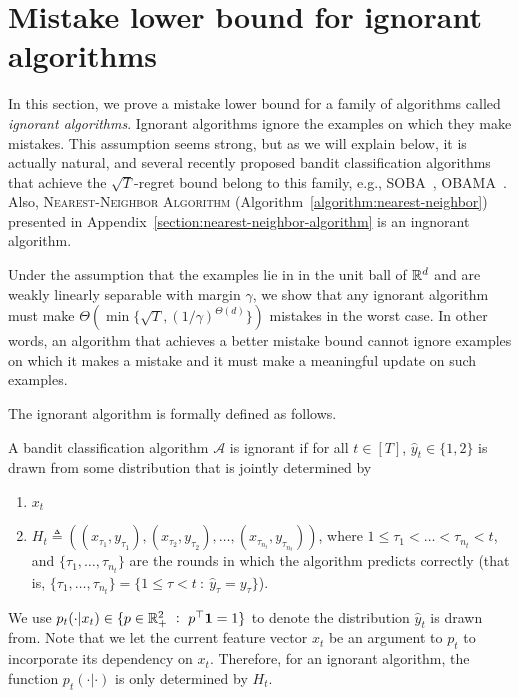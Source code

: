 \section{Mistake lower bound for ignorant algorithms}
\label{section:mistake-lower-bound-for-ignorant-algorithms}

In this section, we prove a mistake lower bound for a family of algorithms
called \textit{ignorant algorithms}. Ignorant algorithms ignore the examples on
which they make mistakes. This assumption seems strong, but as we will explain
below, it is actually natural, and several recently proposed bandit
classification algorithms that achieve the $\sqrt{T}$-regret bound belong to
this family, e.g., SOBA~\citep{Beygelzimer-Orabona-Zhang-2017},
OBAMA~\citep{Foster-Kale-Luo-Mohri-Sridharan-2018}. Also,
\textsc{Nearest-Neighbor Algorithm} (Algorithm~\ref{algorithm:nearest-neighbor})
presented in Appendix~\ref{section:nearest-neighbor-algorithm} is an ingnorant
algorithm.

Under the assumption that the examples lie in in the unit ball of $\mathbb{R}^d$ and are
weakly linearly separable with margin $\gamma$, we show that any ignorant
algorithm must make $\Theta\left(\min\{\sqrt{T},
(1/\gamma)^{\Theta(d)}\}\right)$ mistakes in the worst case. In other words, an
algorithm that achieves a better mistake bound cannot ignore examples on which
it makes a mistake and it must make a meaningful update on such examples.

The ignorant algorithm is formally defined as follows.
\begin{definition} \label{definition:ignorant-algorithm}
A bandit classification algorithm $\mathcal{A}$ is ignorant if for all
$t\in[T]$, $\widehat y_t\in \{1,2\}$ is drawn from some distribution that is
jointly determined by
\begin{enumerate}
\item $x_t$
\item $H_t \triangleq \left( (x_{\tau_1}, y_{\tau_1}), (x_{\tau_2}, y_{\tau_2}), \ldots, (x_{\tau_{n_t}}, y_{\tau_{n_t}}) \right)$,
where $1 \le \tau_1 < \dots < \tau_{n_t} < t$, and $\{\tau_1, \ldots, \tau_{n_t}\}$
are the rounds in which the algorithm predicts correctly (that is,
$\{\tau_1, \ldots, \tau_{n_t}\} = \{1 \le \tau < t ~:~ \widehat y_\tau=y_\tau\}$).
\end{enumerate}
We use $p_t(\cdot|x_t)\in \{p\in \mathbb{R}_+^2 ~:~ p^\top\mathbf{1}=1\}$ to denote
the distribution $\widehat y_t$ is drawn from. Note that we let the current
feature vector $x_t$ be an argument to $p_t$ to incorporate its dependency on
$x_t$. Therefore, for an ignorant algorithm, the function $p_t(\cdot|\cdot)$ is
only determined by $H_t$.
\end{definition}

